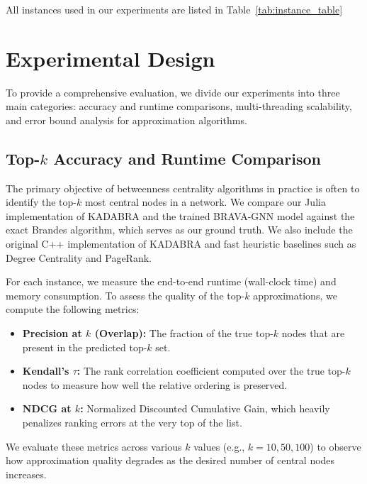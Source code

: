All instances used in our experiments are listed in Table~\ref{tab:instance_table}
\begin{table}[h]
    \centering
    \resizebox{.4\textwidth}{!}{
        
    }
    \caption{Overview of instances: $n$ is the number of vertices, $m$ the number of edges, 
    Sources: [1] KONECT~\parencite{kunegis_konect_2013}, [2] Zafrani~\parencite{zafarani_social_2009}; unmarked instances are from SNAP~\parencite{leskovec_snap_2014}.    }
    \label{tab:instance_table}
\end{table}

\section{Experimental Design}

To provide a comprehensive evaluation, we divide our experiments into three main categories: accuracy and runtime comparisons, multi-threading scalability, and error bound analysis for approximation algorithms.

\subsection{Top-$k$ Accuracy and Runtime Comparison}
The primary objective of betweenness centrality algorithms in practice is often to identify the top-$k$ most central nodes in a network. We compare our Julia implementation of KADABRA and the trained BRAVA-GNN model against the exact Brandes algorithm, which serves as our ground truth. We also include the original C++ implementation of KADABRA and fast heuristic baselines such as Degree Centrality and PageRank.

For each instance, we measure the end-to-end runtime (wall-clock time) and memory consumption. To assess the quality of the top-$k$ approximations, we compute the following metrics:
\begin{itemize}
    \item \textbf{Precision at $k$ (Overlap):} The fraction of the true top-$k$ nodes that are present in the predicted top-$k$ set.
    \item \textbf{Kendall's $\tau$:} The rank correlation coefficient computed over the true top-$k$ nodes to measure how well the relative ordering is preserved.
    \item \textbf{NDCG at $k$:} Normalized Discounted Cumulative Gain, which heavily penalizes ranking errors at the very top of the list.
\end{itemize}
We evaluate these metrics across various $k$ values (e.g., $k=10, 50, 100$) to observe how approximation quality degrades as the desired number of central nodes increases.

